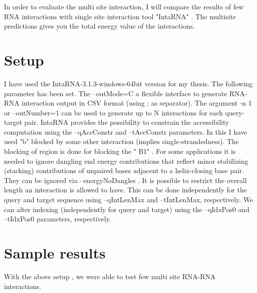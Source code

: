 \documentclass[twoside,a4paper]{report}
\begin{document}
	In order to evaluate the multi site interaction, I will compare the results of few RNA interactions with single site interaction tool "IntaRNA" . The multisite predictions gives you the total energy value of the interactions.\\ 
	
	
	\section{Setup}
	
	I have used the IntaRNA-3.1.3-windows-64bit version for my thesis. The following parameter has been set. The --outMode=C a flexible interface to generate RNA-RNA interaction output in CSV format (using ; as separator). The argument -n 1 or --outNumber=1 can be used to generate up to N interactions for each query-target pair. IntaRNA provides the possibility to constrain the accessibility computation using the --qAccConstr and --tAccConstr parameters. In this I have used "b" blocked by some other interaction (implies single-strandedness). The blocking of region is done for blocking the " B1" . For some applications it is needed to ignore dangling end energy contributions that reflect minor stabilizing (stacking) contributions of unpaired bases adjacent to a helix-closing base pair. They can be ignored via --energyNoDangles . It is possible to restrict the overall length an interaction is allowed to have. This can be done independently for the query and target sequence using --qIntLenMax and --tIntLenMax, respectively. We can alter indexing (independently for query and target) using the --qIdxPos0 and --tIdxPos0 parameters, respectively.\\
	
	\section{ Sample results}
	
	With the above setup , we were able to test few multi site RNA-RNA interactions.\\
	
%	
	
\end{document}
